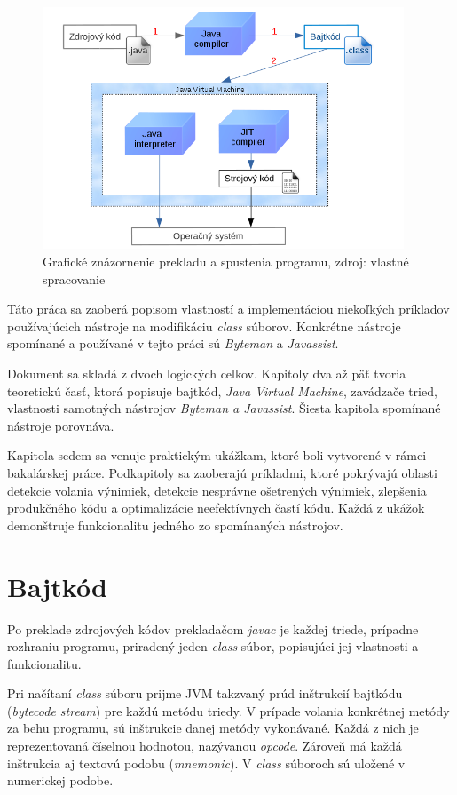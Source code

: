 \documentclass[11pt,final,oneside]{fithesis}
\begin{document}
\begin{figure}[h]
  \centering
   \includegraphics[width=0.96\textwidth]{JVM.png}
  \caption{Grafické znázornenie prekladu a spustenia programu, zdroj: vlastné
  spracovanie}
  \label{fig:jvm}
\end{figure}

Táto práca sa zaoberá popisom vlastností a implementáciou niekoľkých príkladov 
používajúcich nástroje na modifikáciu \textit{class} súborov. 
Konkrétne nástroje spomínané a používané v tejto práci sú \textit{Byteman} a
\textit{Javassist}.

Dokument sa skladá z dvoch logických celkov. Kapitoly dva až päť tvoria
teoretickú časť, ktorá popisuje bajtkód, \textit{Java Virtual Machine},
zavádzače tried, vlastnosti samotných nástrojov \textit{Byteman a Javassist}. 
Šiesta kapitola spomínané nástroje porovnáva.

Kapitola sedem sa venuje praktickým ukážkam, ktoré boli vytvorené v rámci
bakalárskej práce. Podkapitoly sa zaoberajú príkladmi, ktoré pokrývajú
oblasti detekcie volania výnimiek, detekcie nesprávne ošetrených výnimiek,
zlepšenia produkčného kódu a optimalizácie neefektívnych častí kódu. Každá z
ukážok demonštruje funkcionalitu jedného zo spomínaných nástrojov.

\chapter{Bajtkód}
\label{chap:bytecode}

Po preklade zdrojových kódov prekladačom \textit{javac} je každej
triede, prípadne rozhraniu programu, priradený jeden \textit{class} súbor,
popisujúci jej vlastnosti a funkcionalitu.

Pri načítaní \textit{class} súboru prijme JVM takzvaný prúd inštrukcií
bajtkódu (\textit{bytecode stream}) pre každú metódu triedy. V prípade volania
konkrétnej metódy za behu programu, sú inštrukcie danej metódy vykonávané.
Každá z nich je reprezentovaná číselnou hodnotou, nazývanou
\textit{opcode}. Zároveň má každá inštrukcia aj textovú podobu (\textit
{mnemonic}). V \textit{class} súboroch sú uložené v numerickej 
podobe.
\end{document}

